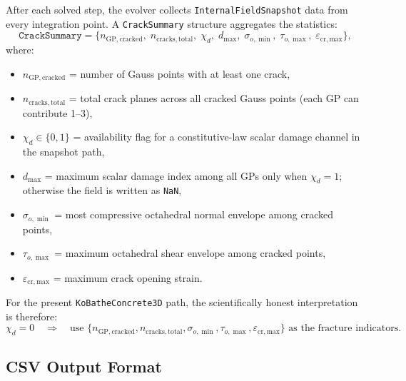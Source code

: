 After each solved step, the evolver collects
\texttt{InternalFieldSnapshot} data from every integration point.
A \texttt{CrackSummary} structure aggregates the statistics:
\begin{equation}
  \texttt{CrackSummary} =
  \bigl\{
    n_{\mathrm{GP, cracked}},\;
    n_{\mathrm{cracks,total}},\;
    \chi_d,\;
    d_{\max},\;
    \sigma_{o,\min},\;
    \tau_{o,\max},\;
    \varepsilon_{\mathrm{cr,max}}
  \bigr\},
  \label{eq:nlevo-crack-summary}
\end{equation}
where:
\begin{itemize}
  \item $n_{\mathrm{GP, cracked}}$ = number of Gauss points with
        at least one crack,
  \item $n_{\mathrm{cracks,total}}$ = total crack planes across all
        cracked Gauss points (each GP can contribute 1--3),
  \item \(\chi_d \in \{0,1\}\) = availability flag for a constitutive-law
        scalar damage channel in the snapshot path,
  \item $d_{\max}$ = maximum scalar damage index among all GPs only when
        \(\chi_d = 1\); otherwise the field is written as \texttt{NaN},
  \item $\sigma_{o,\min}$ = most compressive octahedral normal envelope among
        cracked points,
  \item $\tau_{o,\max}$ = maximum octahedral shear envelope among cracked
        points,
  \item $\varepsilon_{\mathrm{cr,max}}$ = maximum crack opening strain.
\end{itemize}

For the present \texttt{KoBatheConcrete3D} path, the scientifically honest
interpretation is therefore:
\begin{equation}
  \chi_d = 0
  \quad\Longrightarrow\quad
  \text{use }
  \{n_{\mathrm{GP, cracked}}, n_{\mathrm{cracks,total}},
    \sigma_{o,\min}, \tau_{o,\max}, \varepsilon_{\mathrm{cr,max}}\}
  \text{ as the fracture indicators.}
\end{equation}

\subsection{CSV Output Format}

